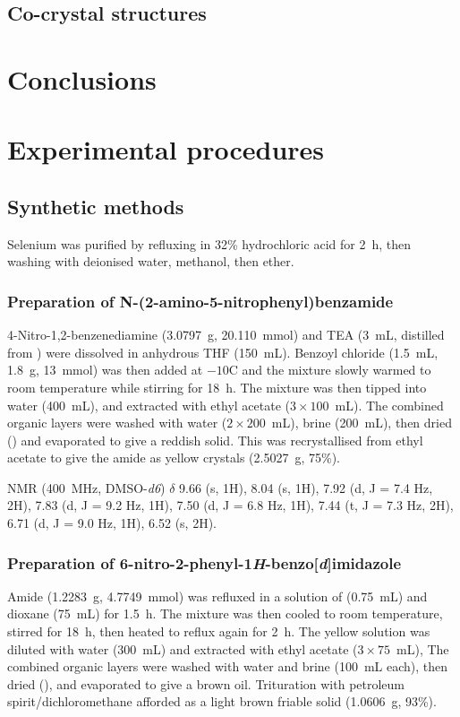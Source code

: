 \begin{refsection}
\subsection{Co-crystal structures}

\section{Conclusions}

\section{Experimental procedures}

\subsection{Synthetic methods}

Selenium was purified by refluxing in 32\% hydrochloric acid for 2~h, then washing with deionised water, methanol, then ether.

\subsubsection{Preparation of N-(2-amino-5-nitrophenyl)benzamide }
4-Nitro-1,2-benzenediamine (3.0797~g, 20.110~mmol) and TEA (3~mL, distilled from ) were dissolved in anhydrous THF (150~mL).
Benzoyl chloride (1.5~mL, 1.8~g, 13~mmol) was then added at $-10$\degree C and the mixture slowly warmed to room temperature while stirring for 18~h.
The mixture was then tipped into water (400~mL), and extracted with ethyl acetate ($3\times100$~mL).
The combined organic layers were washed with water ($2\times200$~mL), brine (200~mL), then dried () and evaporated to give a reddish solid.
This was recrystallised from ethyl acetate to give the amide  as yellow crystals (2.5027~g, 75\%).

 NMR (400~MHz, DMSO-\emph{d6}) $\delta$ 9.66 (s, 1H), 8.04 (s, 1H), 7.92 (d, J = 7.4 Hz, 2H), 7.83 (d, J = 9.2 Hz, 1H), 7.50 (d, J = 6.8 Hz, 1H), 7.44 (t, J = 7.3 Hz, 2H), 6.71 (d, J = 9.0 Hz, 1H), 6.52 (s, 2H).

\subsubsection{Preparation of 6-nitro-2-phenyl-1\emph{H}-benzo[\emph{d}]imidazole }
Amide  (1.2283~g, 4.7749~mmol) was refluxed in a solution of  (0.75~mL) and dioxane (75~mL) for 1.5~h.
The mixture was then cooled to room temperature, stirred for 18~h, then heated to reflux again for 2~h.
The yellow solution was diluted with water (300~mL) and extracted with ethyl acetate ($3\times75$~mL),
The combined organic layers were washed with water and brine (100~mL each), then dried (), and evaporated to give a brown oil.
Trituration with petroleum spirit/dichloromethane afforded  as a light brown friable solid (1.0606~g, 93\%).


\end{refsection}
